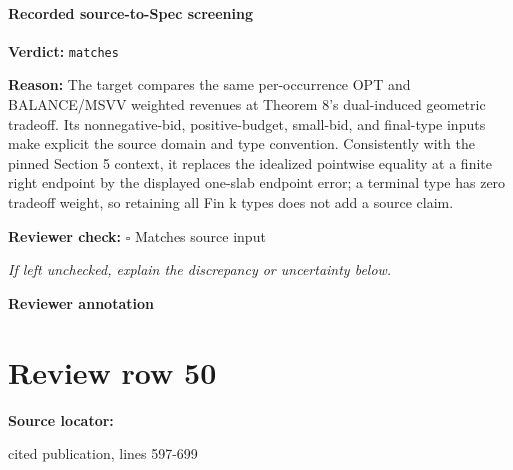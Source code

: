 \documentclass[10pt]{article}
\newcommand{\reviewerbox}{%
  \par\noindent\fbox{\parbox{0.96\linewidth}{\rule{0pt}{0.38in}}}\par
}
\newcommand{\reviewmatch}[1]{%
  \par\noindent\textbf{Reviewer check:} $\square$\; #1\par
  \noindent\emph{If left unchecked, explain the discrepancy or uncertainty below.}\par
}
\begin{document}
\paragraph{Recorded source-to-Spec screening}
\textbf{Verdict:} \texttt{matches}
\\
{\raggedright
\textbf{Reason:} The target compares the same per-\allowbreak{}occurrence OPT and BALANCE/\allowbreak{}MSVV weighted revenues at Theorem 8's dual-\allowbreak{}induced geometric tradeoff.\allowbreak{} Its nonnegative-\allowbreak{}bid, positive-\allowbreak{}budget, small-\allowbreak{}bid, and final-\allowbreak{}type inputs make explicit the source domain and type convention.\allowbreak{} Consistently with the pinned Section 5 context, it replaces the idealized pointwise equality at a finite right endpoint by the displayed one-\allowbreak{}slab endpoint error;\allowbreak{} a terminal type has zero tradeoff weight, so retaining all Fin k types does not add a source claim.\allowbreak{}
\par}
\reviewmatch{Matches source input}
\noindent\textbf{Reviewer annotation}\par
\reviewerbox
\clearpage
\hypertarget{source-claim-c102fc02873e5d38}{}
\section*{Review row 50}
\textbf{Source locator:} {\footnotesize\raggedright cited publication, lines 597-\allowbreak{}699\par}
\end{document}
